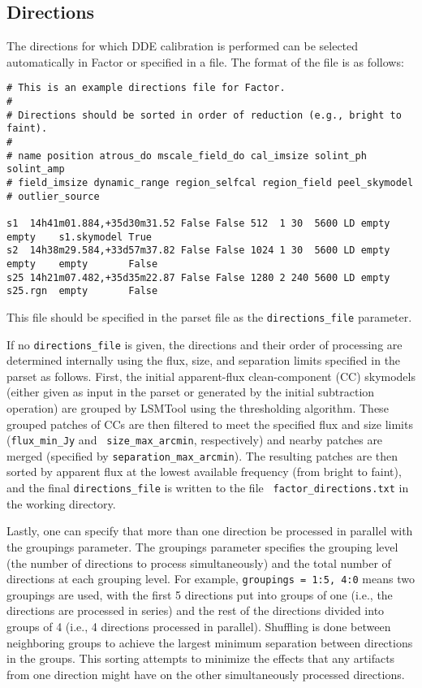 \documentclass[structabstract]{article}
\begin{document}
\subsection{Directions}
\label{factor:directions}

The directions for which DDE calibration is performed can be selected
automatically in Factor or specified in a file. The format of the file is as
follows:

\begin{verbatim}
# This is an example directions file for Factor.
#
# Directions should be sorted in order of reduction (e.g., bright to faint).
#
# name position atrous_do mscale_field_do cal_imsize solint_ph solint_amp
# field_imsize dynamic_range region_selfcal region_field peel_skymodel
# outlier_source

s1  14h41m01.884,+35d30m31.52 False False 512  1 30  5600 LD empty empty    s1.skymodel True
s2  14h38m29.584,+33d57m37.82 False False 1024 1 30  5600 LD empty empty    empty       False
s25 14h21m07.482,+35d35m22.87 False False 1280 2 240 5600 LD empty s25.rgn  empty       False
\end{verbatim}
This file should be specified in the parset file as the {\tt directions\_file}
parameter.

If no {\tt directions\_file} is given, the directions and their order of
processing are determined internally using the flux, size, and separation limits
specified in the parset as follows. First, the initial apparent-flux
clean-component (CC) skymodels (either given as input in the parset or generated
by the initial subtraction operation) are grouped by LSMTool using the
thresholding algorithm. These grouped patches of CCs are then filtered to meet
the specified flux and size limits ({\tt flux\_min\_Jy} and {\tt
size\_max\_arcmin}, respectively) and nearby patches are merged (specified by
{\tt separation\_max\_arcmin}). The resulting patches are then sorted by
apparent flux at the lowest available frequency (from bright to faint), and the
final {\tt directions\_file} is written to the file {\tt
factor\_directions.txt} in the working directory.

Lastly, one can specify that more than one direction be processed in parallel
with the groupings parameter. The groupings parameter specifies the grouping
level (the number of directions to process simultaneously) and the total number
of directions at each grouping level. For example, {\tt groupings = 1:5, 4:0}
means two groupings are used, with the first 5 directions put into groups of one
(i.e., the directions are processed in series) and the rest of the directions
divided into groups of 4 (i.e., 4 directions processed in parallel). Shuffling
is done between neighboring groups to achieve the largest minimum separation
between directions in the groups. This sorting attempts to minimize the effects
that any artifacts from one direction might have on the other simultaneously
processed directions.
\end{document}
